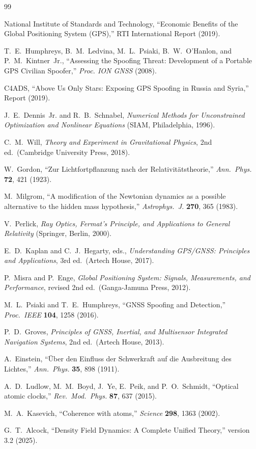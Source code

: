 \documentclass[aps,prd,twocolumn,superscriptaddress,nofootinbib,floatfix]{revtex4-2}
\begin{document}
\begin{thebibliography}{99}

National Institute of Standards and Technology,
``Economic Benefits of the Global Positioning System (GPS),''
RTI International Report (2019).

T.~E.~Humphreys, B.~M.~Ledvina, M.~L.~Psiaki, B.~W.~O'Hanlon,
and P.~M.~Kintner~Jr.,
``Assessing the Spoofing Threat: Development of a Portable GPS
Civilian Spoofer,''
\emph{Proc. ION GNSS} (2008).

C4ADS,
``Above Us Only Stars: Exposing GPS Spoofing in Russia and Syria,''
Report (2019).

J.~E.~Dennis~Jr. and R.~B.~Schnabel,
\emph{Numerical Methods for Unconstrained Optimization and Nonlinear Equations}
(SIAM, Philadelphia, 1996).

C.~M.~Will,
\emph{Theory and Experiment in Gravitational Physics},
2nd ed.\ (Cambridge University Press, 2018).

W.~Gordon,
``Zur Lichtfortpflanzung nach der Relativit\"atstheorie,''
\emph{Ann.\ Phys.} \textbf{72}, 421 (1923).

M.~Milgrom,
``A modification of the Newtonian dynamics as a possible alternative
to the hidden mass hypothesis,''
\emph{Astrophys.\ J.} \textbf{270}, 365 (1983).

V.~Perlick,
\emph{Ray Optics, Fermat's Principle, and Applications to General
Relativity} (Springer, Berlin, 2000).

E.~D.~Kaplan and C.~J.~Hegarty, eds.,
\emph{Understanding GPS/GNSS: Principles and Applications},
3rd ed.\ (Artech House, 2017).

P.~Misra and P.~Enge,
\emph{Global Positioning System: Signals, Measurements, and Performance},
revised 2nd ed.\ (Ganga-Jamuna Press, 2012).

M.~L.~Psiaki and T.~E.~Humphreys,
``GNSS Spoofing and Detection,''
\emph{Proc.\ IEEE} \textbf{104}, 1258 (2016).

P.~D.~Groves,
\emph{Principles of GNSS, Inertial, and Multisensor Integrated Navigation Systems},
2nd ed.\ (Artech House, 2013).

A.~Einstein,
``\"Uber den Einfluss der Schwerkraft auf die Ausbreitung des Lichtes,''
\emph{Ann.\ Phys.} \textbf{35}, 898 (1911).

A.~D.~Ludlow, M.~M.~Boyd, J.~Ye, E.~Peik, and P.~O.~Schmidt,
``Optical atomic clocks,''
\emph{Rev.\ Mod.\ Phys.} \textbf{87}, 637 (2015).

M.~A.~Kasevich,
``Coherence with atoms,''
\emph{Science} \textbf{298}, 1363 (2002).

G.~T.~Alcock,
``Density Field Dynamics: A Complete Unified Theory,''
version 3.2 (2025).

\end{thebibliography}
\end{document}
